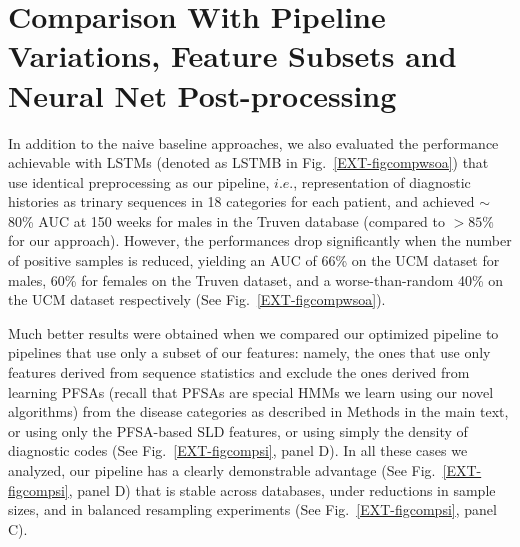 \documentclass[3p,super,numbers,sort&compress,preprint,10pt]{elsarticle}
\begin{document}
\section{Comparison With  Pipeline Variations, Feature Subsets and Neural Net Post-processing}\label{sec:pipelinevar}
In addition to the naive baseline approaches, we also evaluated the performance achievable  with LSTMs (denoted as LSTMB in Fig.~\ref{EXT-figcompwsoa}) that use identical preprocessing as our pipeline, $i.e.$, representation of diagnostic histories as trinary sequences in 18 categories for each patient, and achieved $\sim$80\% AUC  at 150 weeks for males in the Truven database (compared to $> 85\%$ for our approach). However, the performances drop significantly when the number of positive samples is reduced, yielding an AUC of 66\% on the UCM dataset for males, 60\% for females on the Truven dataset, and a  worse-than-random 40\% on the UCM dataset respectively (See Fig.~\ref{EXT-figcompwsoa}). 

  Much better results were obtained when we compared our optimized pipeline to pipelines that use only a subset of our features: namely, the  ones that use only features derived from sequence statistics and exclude the ones derived from learning PFSAs (recall that PFSAs are special HMMs we learn using our novel algorithms)  from the disease categories as described in Methods in the main text, or using only the PFSA-based SLD features, or using simply the density of diagnostic codes (See Fig.~\ref{EXT-figcompsi}, panel D). In all these cases we analyzed, our pipeline has a clearly demonstrable advantage (See  Fig.~\ref{EXT-figcompsi}, panel D) that is stable across databases,  under reductions in sample sizes, and in balanced resampling experiments (See Fig.~\ref{EXT-figcompsi}, panel C).
  
\end{document}
